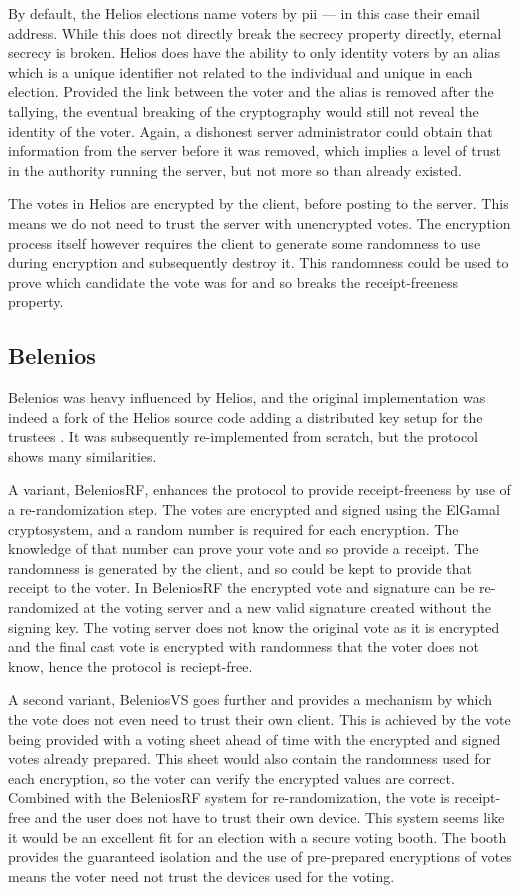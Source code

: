 By default, the Helios elections name voters by \gls{pii} --- in this case their email address. While this does not directly break the secrecy property directly, eternal secrecy is broken. Helios does have the ability to only identity voters by an alias which is a unique identifier not related to the individual and unique in each election. Provided the link between the voter and the alias is removed after the tallying, the eventual breaking of the cryptography would still not reveal the identity of the voter. Again, a dishonest server administrator could obtain that information from the server before it was removed, which implies a level of trust in the authority running the server, but not more so than already existed.

The votes in Helios are encrypted by the client, before posting to the server. This means we do not need to trust the server with unencrypted votes. The encryption process itself however requires the client to generate some randomness to use during encryption and subsequently destroy it. This randomness could be used to prove which candidate the vote was for and so breaks the receipt-freeness property.

\subsection{Belenios}

Belenios was heavy influenced by Helios, and the original implementation was indeed a fork of the Helios source code adding a distributed key setup for the trustees \cite{cortierBeleniosSimplePrivate2019}. It was subsequently re-implemented from scratch, but the protocol shows many similarities.

A variant, BeleniosRF, enhances the protocol to provide receipt-freeness by use of a re-randomization step. The votes are encrypted and signed using the ElGamal cryptosystem, and a random number is required for each encryption. The knowledge of that number can prove your vote and so provide a receipt. The randomness is generated by the client, and so could be kept to provide that receipt to the voter. In BeleniosRF the encrypted vote and signature can be re-randomized at the voting server and a new valid signature created without the signing key. The voting server does not know the original vote as it is encrypted and the final cast vote is encrypted with randomness that the voter does not know, hence the protocol is reciept-free.

A second variant, BeleniosVS goes further and provides a mechanism by which the vote does not even need to trust their own client. This is achieved by the vote being provided with a voting sheet ahead of time with the encrypted and signed votes already prepared. This sheet would also contain the randomness used for each encryption, so the voter can verify the encrypted values are correct. Combined with the BeleniosRF system for re-randomization, the vote is receipt-free and the user does not have to trust their own device. This system seems like it would be an excellent fit for an election with a secure voting booth. The booth provides the guaranteed isolation and the use of pre-prepared encryptions of votes means the voter need not trust the devices used for the voting.

